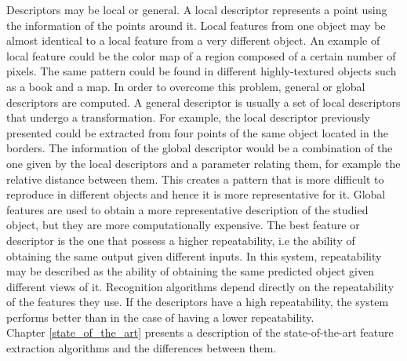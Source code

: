 Descriptors may be local or general. 
A local descriptor represents a point using the information of the points around it. 
Local features from one object may be almost identical to a local feature from a very different object. 
An example of local feature could be the color map of a region composed of a certain number of pixels. 
The same pattern could be found in different highly-textured objects such as a book and a map. 
In order to overcome this problem, general or global descriptors are computed. 
A general descriptor is usually a set of local descriptors that undergo a transformation. 
For example, the local descriptor previously presented could be extracted from four points of the same object located in the borders. 
The information of the global descriptor would be a combination of the one given by the local descriptors and a parameter relating them, for example the relative distance between them. 
This creates a pattern that is more difficult to reproduce in different objects and hence it is more representative for it. 
Global features are used to obtain a more representative description of the studied object, but they are more computationally expensive. 
The best feature or descriptor is the one that possess a higher repeatability, i.e the ability of obtaining the same output given different inputs. 
In this system, repeatability may be described as the ability of obtaining the same predicted object given different views of it. 
Recognition algorithms depend directly on the repeatability of the features they use. 
If the descriptors have a high repeatability, the system performs better than in the case of having a lower repeatability. 
\\

Chapter \ref{state_of_the_art} presents a description of the state-of-the-art feature extraction algorithms and the differences between them. 